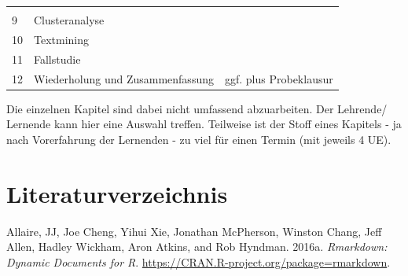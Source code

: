 \documentclass[12pt,]{book}
\begin{document}
\begin{longtable}[]{@{}lll@{}}
\begin{minipage}[t]{0.32\columnwidth}
\strut
\end{minipage}\tabularnewline
\begin{minipage}[t]{0.32\columnwidth}\raggedright\strut
9\strut
\end{minipage} & \begin{minipage}[t]{0.32\columnwidth}\raggedright\strut
Clusteranalyse\strut
\end{minipage} & \begin{minipage}[t]{0.32\columnwidth}\raggedright\strut
\strut
\end{minipage}\tabularnewline
\begin{minipage}[t]{0.32\columnwidth}\raggedright\strut
10\strut
\end{minipage} & \begin{minipage}[t]{0.32\columnwidth}\raggedright\strut
Textmining\strut
\end{minipage} & \begin{minipage}[t]{0.32\columnwidth}\raggedright\strut
\strut
\end{minipage}\tabularnewline
\begin{minipage}[t]{0.32\columnwidth}\raggedright\strut
11\strut
\end{minipage} & \begin{minipage}[t]{0.32\columnwidth}\raggedright\strut
Fallstudie\strut
\end{minipage} & \begin{minipage}[t]{0.32\columnwidth}\raggedright\strut
\strut
\end{minipage}\tabularnewline
12 & Wiederholung und Zusammenfassung & ggf. plus
Probeklausur\tabularnewline
\bottomrule
\end{longtable}

Die einzelnen Kapitel sind dabei nicht umfassend abzuarbeiten. Der
Lehrende/ Lernende kann hier eine Auswahl treffen. Teilweise ist der
Stoff eines Kapitels - ja nach Vorerfahrung der Lernenden - zu viel für
einen Termin (mit jeweils 4 UE).

\chapter{Literaturverzeichnis}\label{literaturverzeichnis}

\hypertarget{refs}{}
\hypertarget{ref-rmarkdown}{}
Allaire, JJ, Joe Cheng, Yihui Xie, Jonathan McPherson, Winston Chang,
Jeff Allen, Hadley Wickham, Aron Atkins, and Rob Hyndman. 2016a.
\emph{Rmarkdown: Dynamic Documents for R}.
\url{https://CRAN.R-project.org/package=rmarkdown}.
\end{document}
